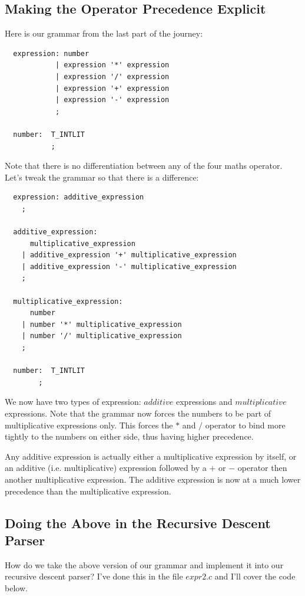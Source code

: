 \documentclass[journal, onecolumn, 12pt]{IEEEtran}
\begin{document}
\subsection{Making the Operator Precedence Explicit}

Here is our grammar from the last part of the journey:

\begin{lstlisting}
  expression: number
            | expression '*' expression
            | expression '/' expression
            | expression '+' expression
            | expression '-' expression
            ;

  number:  T_INTLIT
           ;
\end{lstlisting}

Note that there is no differentiation between any of the four maths operator. Let's tweak the grammar so that there is a difference:

\begin{lstlisting}
  expression: additive_expression
    ;

  additive_expression:
      multiplicative_expression
    | additive_expression '+' multiplicative_expression
    | additive_expression '-' multiplicative_expression
    ;

  multiplicative_expression:
      number
    | number '*' multiplicative_expression
    | number '/' multiplicative_expression
    ;

  number:  T_INTLIT
        ;
\end{lstlisting}

We now have two types of expression: $additive$ expressions and $multiplicative$ expressions. Note that the grammar now forces the numbers to be part of multiplicative expressions only. This forces the $*$ and $/$ operator to bind more tightly to the numbers on either side, thus having higher precedence.

Any additive expression is actually either a multiplicative expression by itself, or an additive (i.e. multiplicative) expression followed by a $+$ or $-$ operator then another multiplicative expression. The additive expression is now at a much lower precedence than the multiplicative expression.

\subsection{Doing the Above in the Recursive Descent Parser}

How do we take the above version of our grammar and implement it into our recursive descent parser? I've done this in the file $expr2.c$ and I'll cover the code below.
\end{document}

